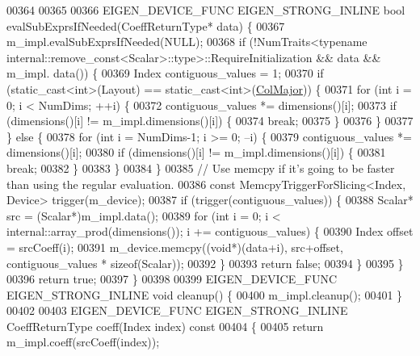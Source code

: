 \begin{DoxyCode}
00364 
00365 
00366   EIGEN\_DEVICE\_FUNC EIGEN\_STRONG\_INLINE \textcolor{keywordtype}{bool} evalSubExprsIfNeeded(CoeffReturnType* data) \{
00367     m\_impl.evalSubExprsIfNeeded(NULL);
00368     \textcolor{keywordflow}{if} (!NumTraits<\textcolor{keyword}{typename} internal::remove\_const<Scalar>::type>::RequireInitialization && data && m\_impl.
      data()) \{
00369       Index contiguous\_values = 1;
00370       \textcolor{keywordflow}{if} (static\_cast<int>(Layout) == \textcolor{keyword}{static\_cast<}\textcolor{keywordtype}{int}\textcolor{keyword}{>}(\hyperlink{group__enums_ggaacded1a18ae58b0f554751f6cdf9eb13a0cbd4bdd0abcfc0224c5fcb5e4f6669a}{ColMajor})) \{
00371         \textcolor{keywordflow}{for} (\textcolor{keywordtype}{int} i = 0; i < NumDims; ++i) \{
00372           contiguous\_values *= dimensions()[i];
00373           \textcolor{keywordflow}{if} (dimensions()[i] != m\_impl.dimensions()[i]) \{
00374             \textcolor{keywordflow}{break};
00375           \}
00376         \}
00377       \} \textcolor{keywordflow}{else} \{
00378         \textcolor{keywordflow}{for} (\textcolor{keywordtype}{int} i = NumDims-1; i >= 0; --i) \{
00379           contiguous\_values *= dimensions()[i];
00380           \textcolor{keywordflow}{if} (dimensions()[i] != m\_impl.dimensions()[i]) \{
00381             \textcolor{keywordflow}{break};
00382           \}
00383         \}
00384       \}
00385       \textcolor{comment}{// Use memcpy if it's going to be faster than using the regular evaluation.}
00386       \textcolor{keyword}{const} MemcpyTriggerForSlicing<Index, Device> trigger(m\_device);
00387       \textcolor{keywordflow}{if} (trigger(contiguous\_values)) \{
00388         Scalar* src = (Scalar*)m\_impl.data();
00389         \textcolor{keywordflow}{for} (\textcolor{keywordtype}{int} i = 0; i < internal::array\_prod(dimensions()); i += contiguous\_values) \{
00390           Index offset = srcCoeff(i);
00391           m\_device.memcpy((\textcolor{keywordtype}{void}*)(data+i), src+offset, contiguous\_values * \textcolor{keyword}{sizeof}(Scalar));
00392         \}
00393         \textcolor{keywordflow}{return} \textcolor{keyword}{false};
00394       \}
00395     \}
00396     \textcolor{keywordflow}{return} \textcolor{keyword}{true};
00397   \}
00398 
00399   EIGEN\_DEVICE\_FUNC EIGEN\_STRONG\_INLINE \textcolor{keywordtype}{void} cleanup() \{
00400     m\_impl.cleanup();
00401   \}
00402 
00403   EIGEN\_DEVICE\_FUNC EIGEN\_STRONG\_INLINE CoeffReturnType coeff(Index index)\textcolor{keyword}{ const}
00404 \textcolor{keyword}{  }\{
00405     \textcolor{keywordflow}{return} m\_impl.coeff(srcCoeff(index));

\end{DoxyCode}
